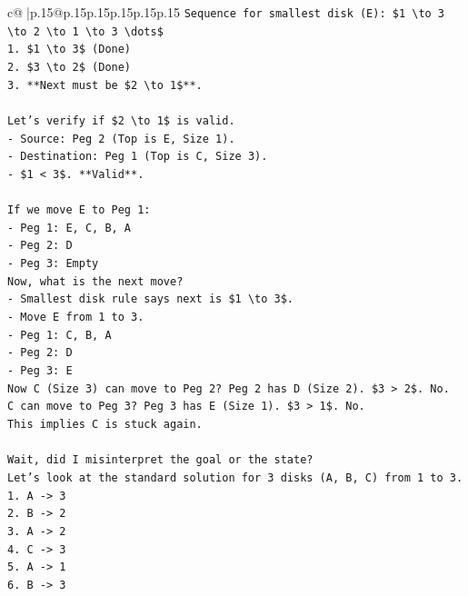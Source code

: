 \documentclass{article}
\begin{document}
{\begin{supertabular}{c@{$\;$}|p{.15\linewidth}@{}p{.15\linewidth}p{.15\linewidth}p{.15\linewidth}p{.15\linewidth}p{.15\linewidth}}
{{{\texttt{Sequence for smallest disk (E): \$1 \textbackslash{}to 3 \textbackslash{}to 2 \textbackslash{}to 1 \textbackslash{}to 3 \textbackslash{}dots\$} \\
\texttt{1. \$1 \textbackslash{}to 3\$ (Done)} \\
\texttt{2. \$3 \textbackslash{}to 2\$ (Done)} \\
\texttt{3. **Next must be \$2 \textbackslash{}to 1\$**.} \\
\\ 
\texttt{Let's verify if \$2 \textbackslash{}to 1\$ is valid.} \\
\texttt{{-} Source: Peg 2 (Top is E, Size 1).} \\
\texttt{{-} Destination: Peg 1 (Top is C, Size 3).} \\
\texttt{{-} \$1 < 3\$. **Valid**.} \\
\\ 
\texttt{If we move E to Peg 1:} \\
\texttt{{-} Peg 1: E, C, B, A} \\
\texttt{{-} Peg 2: D} \\
\texttt{{-} Peg 3: Empty} \\
\texttt{Now, what is the next move?} \\
\texttt{{-} Smallest disk rule says next is \$1 \textbackslash{}to 3\$.} \\
\texttt{{-} Move E from 1 to 3.} \\
\texttt{{-} Peg 1: C, B, A} \\
\texttt{{-} Peg 2: D} \\
\texttt{{-} Peg 3: E} \\
\texttt{Now C (Size 3) can move to Peg 2? Peg 2 has D (Size 2). \$3 > 2\$. No.} \\
\texttt{C can move to Peg 3? Peg 3 has E (Size 1). \$3 > 1\$. No.} \\
\texttt{This implies C is stuck again.} \\
\\ 
\texttt{Wait, did I misinterpret the goal or the state?} \\
\texttt{Let's look at the standard solution for 3 disks (A, B, C) from 1 to 3.} \\
\texttt{1. A {-}> 3} \\
\texttt{2. B {-}> 2} \\
\texttt{3. A {-}> 2} \\
\texttt{4. C {-}> 3} \\
\texttt{5. A {-}> 1} \\
\texttt{6. B {-}> 3} \\
}}}
\end{supertabular}}
\end{document}
